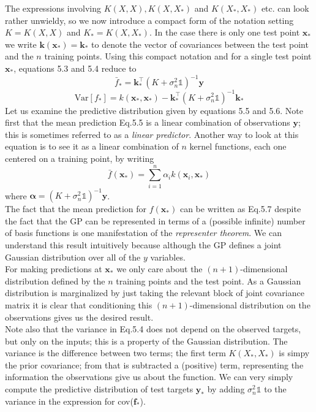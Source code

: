 \documentclass[twoside]{article}
\begin{document}
The expressions involving $K(X, X), K(X, X_*)$ and $K(X_*, X_*)$ etc. can look rather unwieldy, so we now introduce a compact form of the notation setting $K = K(X, X)$ and $K_* = K(X, X_*)$. In the case there is only one test point $\boldsymbol{x}_*$ we write $\boldsymbol{k}(\boldsymbol{x_*}) = \boldsymbol{k_*}$ to denote the vector of covariances between the test point and the $n$ training points. Using this compact notation and for a single test point $\boldsymbol{x}_*$, equations 5.3 and 5.4 reduce to
\begin{equation}
    \bar{f}_* = \boldsymbol{k}_*^\intercal(K + \sigma^2_n\mathds{1})^{-1}\boldsymbol{y}
\end{equation}
\begin{equation}
    \text{Var}[f_*] = k(\boldsymbol{x}_*, \boldsymbol{x}_*) - \boldsymbol{k}_*^\intercal(K + \sigma^2_n\mathds{1})^{-1}\boldsymbol{k}_*
\end{equation}
Let us examine the predictive distribution given by equations 5.5 and 5.6. Note first that the mean prediction Eq.5.5 is a linear combination of observations $\boldsymbol{y}$; this is sometimes referred to as a \textit{linear predictor}. Another way to look at this equation is to see it as a linear combination of $n$ kernel functions, each one centered on a training point, by writing
\begin{equation}
    \bar{f}(\boldsymbol{x}_*) = \sum\limits_{i = 1}^{n} \alpha_i k(\boldsymbol{x}_i, \boldsymbol{x}_*)
\end{equation}
where $\boldsymbol{\alpha} = (K + \sigma^2_n\mathds{1})^{-1}\boldsymbol{y}$.\\
The fact that the mean prediction for $f(\boldsymbol{x}_*)$ can be written as Eq.5.7 despite the fact that the GP can be represented in terms of a (possible infinite) number of basis functions is one manifestation of the \textit{representer theorem}. We can understand this result intuitively because although the GP defines a joint Gaussian distribution over all of the $y$ variables.\\
For making predictions at $\boldsymbol{x}_*$ we only care about the $(n + 1)$-dimensional distribution defined by the $n$ training points and the test point. As a Gaussian distribution is marginalized by just taking the relevant block of joint covariance matrix it is clear that conditioning this $(n + 1)$-dimensional distribution on the observations gives us the desired result.\\
Note also that the variance in Eq.5.4 does not depend on the observed targets, but only on the inputs; this is a property of the Gaussian distribution. The variance is the difference between two terms; the first term $K(X_*, X_*)$ is simpy the prior covariance; from that is subtracted a (positive) term, representing the information the observations give us about the function. We can very simply compute the predictive distribution of test targets $\boldsymbol{y}_*$ by adding $\sigma^2_n\mathds{1}$ to the variance in the expression for cov($\textbf{f}_*$).\medskip
\end{document}
